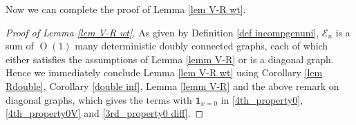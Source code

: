 \documentclass{article}
\makeatletter
\newcommand{\1}{\mathds{1}}
\numberwithin{equation}{section}
\newcommand{\be}{\begin{equation}}
\newcommand{\ee}{\end{equation}}
\newcommand{\fa}{{\mathfrak a}}
\renewcommand{\cal}{\mathcal}
\newcommand{\wt}{\widetilde}
\newcommand{\N}{\mathbb{N}}
\newcommand{\Z}{\mathbb{Z}}
\DeclareMathOperator{\OO}{O}
\theoremstyle{plain} %
\newtheorem{lemma}[theorem]{Lemma}
\theoremstyle{remark}
\newcommand{\Sinfty}{\Sigma^{\infty}}
\newcommand{\wtSinfty}{\wt\Sigma^{\infty}}
\newcommand{\Sele}{{\mathcal E}}
\newcommand{\Selek}{{\mathcal E}}
\newcommand{\Seleinf}{{\mathcal E}^{\infty}}
\newcommand{\Sint}{\mathfrak S}
\newcommand{\Cele}{{\mathscr E}}
\renewcommand{\section}{\@startsection
{section}%
{1}%
{0mm}%
{-2\baselineskip}%
{2\baselineskip}%
{\normalfont\large\scshape\centering}} %
\makeatother
\begin{document}
Now we can complete the proof of Lemma \ref{lem V-R wt}. %
\begin{proof}[Proof of Lemma \ref{lem V-R wt}]
As given by Definition \ref{def incompgenuni}, $\Sele_{n}$ is a sum of $\OO(1)$ many deterministic doubly connected graphs, each of which either satisfies the assumptions of Lemma \ref{lemm V-R} or is a diagonal graph. Hence we immediately conclude Lemma \ref{lem V-R wt} using Corollary \ref{lem Rdouble}, Corollary \ref{double inf}, Lemma \ref{lemm V-R} and the above remark on diagonal graphs, which gives the terms with $\mathbf 1_{x=0}$ in \eqref{4th_property0}, \eqref{4th_property0V} and \eqref{3rd_property0 diff}.  %
\end{proof}

%
\end{document}
